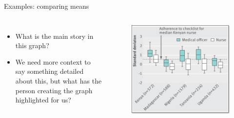 \documentclass[aspectratio=169]{beamer}
\begin{document}
\begin{frame}[fragile]{Examples: comparing means}
	\begin{columns}[c]
		\begin{itemize}
			\item What is the main story in this graph?
			\item We need more context to say something detailed about this, but what has the person creating the graph highlighted for us?
		\end{itemize}
		\begin{figure}
			\centering
			\includegraphics[width=\linewidth]{img/boxplot1}
		\end{figure}
	\end{columns}
\end{frame}
\end{document}

